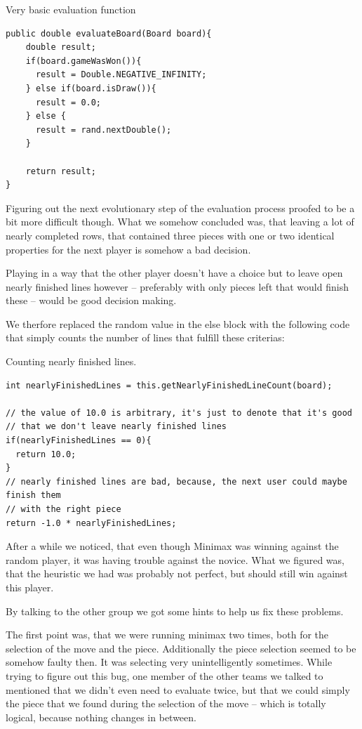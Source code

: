 \documentclass{scrartcl}
\begin{document}
\begin{listing}[H]
\caption{Very basic evaluation function}
\begin{verbatim}
public double evaluateBoard(Board board){
    double result;
    if(board.gameWasWon()){
      result = Double.NEGATIVE_INFINITY;
    } else if(board.isDraw()){
      result = 0.0;
    } else {
      result = rand.nextDouble();
    }

    return result;
}
\end{verbatim}
\end{listing}

Figuring out the next evolutionary step of the evaluation process proofed to be a bit more difficult though. What we somehow concluded was, that leaving a lot of nearly completed rows, that contained three pieces with one or two identical properties for the next player is somehow a bad decision.

Playing in a way that the other player doesn't have a choice but to leave open nearly finished lines however -- preferably with only pieces left that would finish these -- would be good decision making.

We therfore replaced the random value in the else block with the following code that simply counts the number of lines that fulfill these criterias:

\begin{listing}[H]
\caption{Counting nearly finished lines.}
\begin{verbatim}
int nearlyFinishedLines = this.getNearlyFinishedLineCount(board);

// the value of 10.0 is arbitrary, it's just to denote that it's good 
// that we don't leave nearly finished lines
if(nearlyFinishedLines == 0){
  return 10.0;
}
// nearly finished lines are bad, because, the next user could maybe finish them 
// with the right piece
return -1.0 * nearlyFinishedLines;
\end{verbatim}
\end{listing}

After a while we noticed, that even though Minimax was winning against the random player, it was having trouble against the novice. What we figured was, that the heuristic we had was probably not perfect, but should still win against this player.

By talking to the other group we got some hints to help us fix these problems.

The first point was, that we were running minimax two times, both for the selection of the move and the piece. Additionally the piece selection seemed to be somehow faulty then. It was selecting very unintelligently sometimes. While trying to figure out this bug, one member of the other teams we talked to mentioned that we didn't even need to evaluate twice, but that we could simply the piece that we found during the selection of the move -- which  is totally logical, because nothing changes in between.
\end{document}
